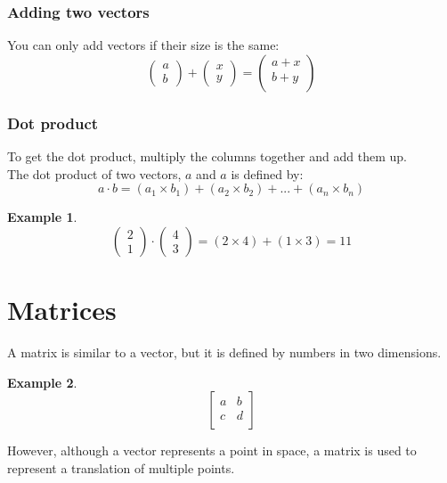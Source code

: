 \documentclass[table]{article}
\theoremstyle{definition}
\newtheorem{ex}{Example}[section]
\begin{document}
    \subsubsection{Adding two vectors}
    You can only add vectors if their size is the same:
    \begin{equation}
        \begin{pmatrix}
          a \\ b        
        \end{pmatrix} +
          \begin{pmatrix}
            x \\ y
          \end{pmatrix}
          =   \begin{pmatrix}
              a + x \\
              b + y \\
            \end{pmatrix}
    \end{equation}
    \subsubsection{Dot product}
    To get the dot product, multiply the columns together and add them up. \\
    The dot product of two vectors, $a$ and $a$ is defined by:
    \[
      a \cdot b = (a_1 \times b_1) + (a_2 \times b_2) + ... + (a_n \times b_n)
    \]
    \begin{ex}
    \begin{equation}
      \begin{pmatrix}
        2 \\ 1
      \end{pmatrix}
    \cdot
    \begin{pmatrix}
      4 \\ 3
    \end{pmatrix}
    = (2 \times 4) + (1 \times 3) = 11
    \end{equation}
    \end{ex}
   
    \section{Matrices}
    A matrix is similar to a vector, but it is defined by numbers in two dimensions.
    \begin{ex}
      \begin{equation}
          \begin{bmatrix}
            a & b \\
            c & d \\
          \end{bmatrix}
      \end{equation}
    \end{ex}
    However, although a vector represents a point in space, a matrix is used to represent 
    a translation of multiple points.
    
\end{document}
